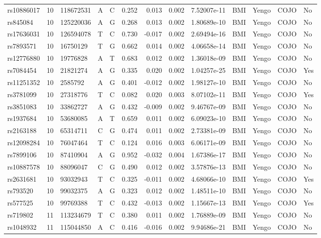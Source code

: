 \documentclass[11pt,twoside]{bristolthesis}
\begin{document}
\begin{longtable}[t]{lrlllrrrlllll}
rs10886017 & 10 & 118672531 & A & C & 0.252 & 0.013 & 0.002 & 7.52007e-11 & BMI & Yengo & COJO & No\\
rs845084 & 10 & 125220036 & A & G & 0.268 & 0.013 & 0.002 & 1.80689e-10 & BMI & Yengo & COJO & No\\
rs17636031 & 10 & 126594078 & T & C & 0.730 & -0.017 & 0.002 & 2.69494e-16 & BMI & Yengo & COJO & No\\
\addlinespace
rs7893571 & 10 & 16750129 & T & G & 0.662 & 0.014 & 0.002 & 4.06658e-14 & BMI & Yengo & COJO & No\\
rs12776880 & 10 & 19776828 & A & T & 0.683 & 0.012 & 0.002 & 1.36018e-09 & BMI & Yengo & COJO & No\\
rs7084454 & 10 & 21821274 & A & G & 0.335 & 0.020 & 0.002 & 1.04257e-25 & BMI & Yengo & COJO & Yes\\
rs11251352 & 10 & 2585792 & A & G & 0.401 & -0.012 & 0.002 & 1.98127e-10 & BMI & Yengo & COJO & No\\
rs3781099 & 10 & 27318776 & T & C & 0.082 & 0.020 & 0.003 & 8.07102e-11 & BMI & Yengo & COJO & Yes\\
\addlinespace
rs3851083 & 10 & 33862727 & A & G & 0.432 & -0.009 & 0.002 & 9.46767e-09 & BMI & Yengo & COJO & No\\
rs1937684 & 10 & 53680085 & A & T & 0.659 & 0.011 & 0.002 & 6.09023e-10 & BMI & Yengo & COJO & No\\
rs2163188 & 10 & 65314711 & C & G & 0.474 & 0.011 & 0.002 & 2.73381e-09 & BMI & Yengo & COJO & No\\
rs12098284 & 10 & 76047464 & T & C & 0.124 & 0.016 & 0.003 & 6.06171e-09 & BMI & Yengo & COJO & No\\
rs7899106 & 10 & 87410904 & A & G & 0.952 & -0.032 & 0.004 & 1.67386e-17 & BMI & Yengo & COJO & No\\
\addlinespace
rs10887578 & 10 & 88096047 & C & G & 0.490 & 0.012 & 0.002 & 3.57876e-13 & BMI & Yengo & COJO & No\\
rs2631681 & 10 & 93032943 & T & C & 0.325 & -0.011 & 0.002 & 4.68066e-10 & BMI & Yengo & COJO & Yes\\
rs793520 & 10 & 99032375 & A & G & 0.323 & 0.012 & 0.002 & 1.48511e-10 & BMI & Yengo & COJO & No\\
rs577525 & 10 & 99769388 & T & C & 0.432 & -0.013 & 0.002 & 1.15667e-13 & BMI & Yengo & COJO & Yes\\
rs719802 & 11 & 113234679 & T & C & 0.380 & 0.011 & 0.002 & 1.76889e-09 & BMI & Yengo & COJO & No\\
\addlinespace
rs1048932 & 11 & 115044850 & A & C & 0.416 & -0.016 & 0.002 & 9.94686e-21 & BMI & Yengo & COJO & No\\

\end{longtable}
\end{document}
